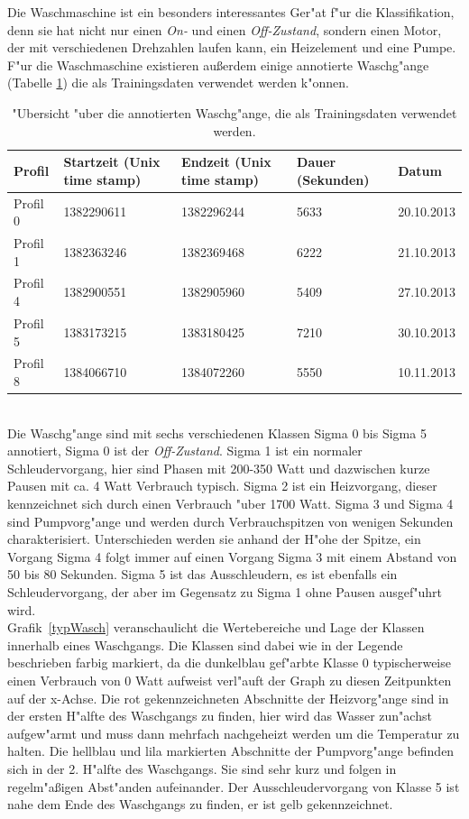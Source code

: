 Die Waschmaschine ist ein besonders interessantes Ger"at f"ur die Klassifikation, denn sie hat nicht nur einen \textit{On-} und einen \textit{Off-Zustand}, sondern einen Motor, der mit verschiedenen Drehzahlen laufen kann, ein Heizelement und eine Pumpe. F"ur die Waschmaschine existieren au{\ss}erdem einige annotierte Waschg"ange (Tabelle \ref{profile01458}) die als Trainingsdaten verwendet werden k"onnen.\\
\begin{table}[h]
\begin{tabular}{l|p{3.5cm}|p{3.5cm}|l|l}
Profil & Startzeit \newline (Unix time stamp) & Endzeit \newline (Unix time stamp) & Dauer (Sekunden) & Datum \\
\hline
Profil 0 & 1382290611 & 1382296244 & 5633 & 20.10.2013 \\
Profil 1 & 1382363246 & 1382369468 & 6222 & 21.10.2013 \\
Profil 4 & 1382900551 & 1382905960 & 5409 & 27.10.2013 \\
Profil 5 & 1383173215 & 1383180425 & 7210 & 30.10.2013 \\
Profil 8 & 1384066710 & 1384072260 & 5550 & 10.11.2013
\end{tabular}
\caption["Ubersicht Trainingsdaten]{"Ubersicht "uber die annotierten Waschg"ange, die als Trainingsdaten verwendet werden.}
\label{profile01458}
\end{table}\\
Die Waschg"ange sind mit sechs verschiedenen Klassen Sigma 0 bis Sigma 5 annotiert, Sigma 0 ist der \textit{Off-Zustand}. Sigma 1 ist ein normaler Schleudervorgang, hier sind Phasen mit 200-350 Watt und dazwischen kurze Pausen mit ca. 4 Watt Verbrauch typisch.
Sigma 2 ist ein Heizvorgang, dieser kennzeichnet sich durch einen Verbrauch "uber 1700 Watt.
Sigma 3 und Sigma 4 sind Pumpvorg"ange und werden durch Verbrauchspitzen von wenigen Sekunden charakterisiert. Unterschieden werden sie anhand der H"ohe der Spitze, ein Vorgang Sigma 4 folgt immer auf einen Vorgang Sigma 3 mit einem Abstand von 50 bis 80 Sekunden.
Sigma 5 ist das Ausschleudern, es ist ebenfalls ein Schleudervorgang, der aber im Gegensatz zu Sigma 1 ohne Pausen ausgef"uhrt wird. \\
Grafik~\ref{typWasch} veranschaulicht die Wertebereiche und Lage der Klassen innerhalb eines Waschgangs. Die Klassen sind dabei wie in der Legende beschrieben farbig markiert, da die dunkelblau  gef"arbte Klasse 0 typischerweise einen Verbrauch von 0 Watt aufweist verl"auft der Graph zu diesen Zeitpunkten auf der x-Achse. Die rot gekennzeichneten Abschnitte der Heizvorg"ange sind in der ersten H"alfte des Waschgangs zu finden, hier wird das Wasser zun"achst aufgew"armt und muss dann mehrfach nachgeheizt werden um die Temperatur zu halten. Die hellblau und lila markierten Abschnitte der Pumpvorg"ange befinden sich in der 2. H"alfte des Waschgangs. Sie sind sehr kurz und folgen in regelm"a{\ss}igen Abst"anden aufeinander. Der Ausschleudervorgang von Klasse 5 ist nahe dem Ende des Waschgangs zu finden, er ist gelb gekennzeichnet.
